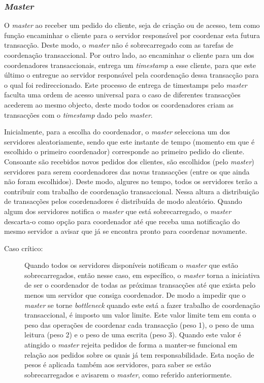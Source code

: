 \subsubsection{\textit{Master}}

O \textit{\textit{master}} ao receber um pedido do cliente, seja de criação ou de acesso, tem como função encaminhar o cliente para o servidor responsável por coordenar esta futura transacção. Deste modo, o \textit{master} não é sobrecarregado com as tarefas de coordenação transaccional. Por outro lado, ao encaminhar o cliente para um dos coordenadores transaccionais, entrega um \textit{timestamp} a esse cliente, para que este último o entregue ao servidor responsável pela coordenação dessa transacção para o qual foi redireccionado. Este processo de entrega de timestamps pelo \textit{master} faculta uma ordem de acesso universal para o caso de diferentes transacções acederem ao mesmo objecto, deste modo todos os coordenadores criam as transacções com o \textit{timestamp} dado pelo \textit{master}.

Inicialmente, para a escolha do coordenador, o \textit{master} selecciona um dos servidores aleatoriamente, sendo que este instante de tempo (momento em que é escolhido o primeiro coordenador) corresponde ao primeiro pedido do cliente. Consoante são recebidos novos pedidos dos clientes, são escolhidos (pelo \textit{master}) servidores para serem coordenadores das novas transacções (entre os que ainda não foram escolhidos). Deste modo, algures no tempo, todos os servidores terão a contribuir com trabalho de coordenação transaccional. Nessa altura a distribuição de transacções pelos coordenadores é distribuída de modo aleatório. Quando algum dos servidores notifica o \textit{master} que está  sobrecarregado, o \textit{master} descarta-o como opção para coordenador até que receba uma notificação do mesmo servidor a avisar que já se encontra pronto para coordenar novamente.

\begin{description}
\item[Caso crítico:] Quando todos os servidores disponíveis notificam o \textit{master} que estão sobrecarregados, então nesse caso, em específico, o \textit{master} torna a iniciativa de ser o coordenador de todas as próximas transacções até que exista pelo menos um servidor que consiga coordenador. De modo a impedir que o \textit{master} se torne \textit{bottleneck} quando este está a fazer trabalho de coordenação transaccional, é imposto um valor limite. Este valor limite tem em conta o peso das operações de coordenar cada transacção (peso 1), o peso de uma leitura (peso 2) e o peso de uma escrita (peso 3). Quando este valor é atingido o \textit{master} rejeita pedidos de forma a manter-se funcional em relação aos pedidos sobre os quais já tem responsabilidade. Esta noção de pesos é aplicada também aos servidores, para saber se estão sobrecarregados e avisarem o \textit{master}, como referido anteriormente.
\end{description}

